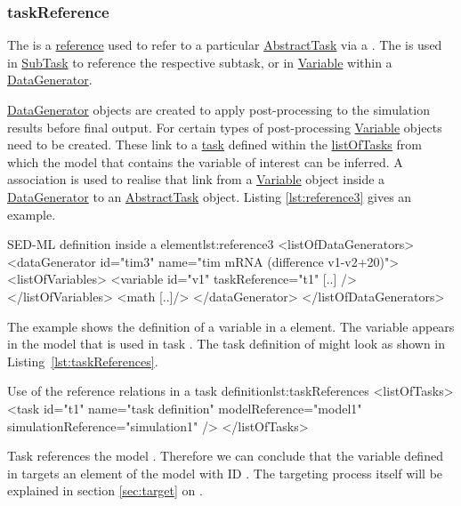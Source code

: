 \subsubsection{taskReference}
\label{sec:taskReference}
The  is a \hyperref[sec:reference]{reference} used to refer to a particular \hyperref[class:abstractTask]{AbstractTask} via a \hyperref[type:sidref]{}. The  is used in \hyperref[class:subTask]{SubTask} to reference the respective subtask, or in \hyperref[class:variable]{Variable} within a \hyperref[class:dataGenerator]{DataGenerator}.

\hyperref[class:dataGenerator]{DataGenerator} objects are created to apply post-processing to the simulation results before final output. 
For certain types of post-processing \hyperref[class:variable]{Variable} objects need to be created.
These link to a \hyperref[class:abstractTask]{task} defined within the \hyperref[sec:listOfTasks]{listOfTasks} from which the model that contains the variable of interest can be inferred. A  association is used to realise that link from a \hyperref[class:variable]{Variable} object inside a \hyperref[class:dataGenerator]{DataGenerator} to an \hyperref[class:abstractTask]{AbstractTask} object. Listing \ref{lst:reference3} gives an example.

\begin{myXmlLst}{SED-ML  definition inside a  element}{lst:reference3}
<listOfDataGenerators>
	<dataGenerator id="tim3" name="tim mRNA (difference v1-v2+20)">
	<listOfVariables>
   		<variable id="v1" taskReference="t1" [..] />
  	</listOfVariables>
  	<math [..]/>
	</dataGenerator>
</listOfDataGenerators>
\end{myXmlLst}

The example shows the definition of a variable  in a  element. The variable appears in the model that is used in task . The task definition of  might look as shown in Listing~\ref{lst:taskReferences}.

\begin{myXmlLst}{Use of the reference relations in a task definition}{lst:taskReferences}
<listOfTasks>
	<task id="t1" name="task definition" modelReference="model1" simulationReference="simulation1" />
</listOfTasks>
\end{myXmlLst}
Task  references the model . Therefore we can conclude that the variable  defined in  targets an element of the model with ID . The targeting process itself will be explained in section \ref{sec:target} on .


